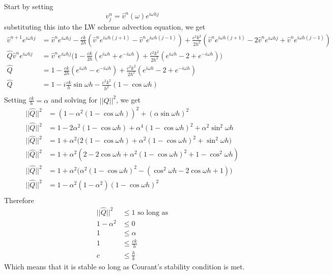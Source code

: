 \\
\\
Start by setting
\begin{equation*}
  v^n_j = \hat{v}^n(\omega)e^{i\omega hj}
\end{equation*}
substituting this into the LW scheme advection equation, we get
\begin{equation*}
\begin{aligned}
  \hat{v}^{n+1}e^{i\omega hj} &= \hat{v}^ne^{i\omega hj}-\frac{ck}{2h}(\hat{v}^ne^{i\omega h(j+1)} - \hat{v}^ne^{i\omega h(j-1)}) + \frac{c^2k^2}{2h^2}(\hat{v}^ne^{i\omega h(j+1)} -2\hat{v}^ne^{i\omega hj} + \hat{v}^ne^{i\omega h(j-1)}) \\
  \hat{Q}\hat{v}^ne^{i\omega hj} &= \hat{v}^ne^{i\omega hj} \big(1 - \frac{ck}{2h}(e^{i\omega h}+e^{-i\omega h}) + \frac{c^2k^2}{2h^2}(e^{i\omega h} -2+ e^{-i\omega h})\big)\\
  \hat{Q} &= 1 - \frac{ck}{2h}(e^{i\omega h}-e^{-i\omega h}) + \frac{c^2k^2}{2h^2}(e^{i\omega h} -2+ e^{-i\omega h})\\
  \hat{Q} &= 1 - i\frac{ck}{h}\sin\omega h - \frac{c^2k^2}{h^2}(1 - \cos\omega h)\\
\end{aligned}
\end{equation*}
Setting $\frac{ck}{h}=\alpha$ and solving for $||\hat{Q}||^2$, we get
\begin{equation*}
\begin{aligned}
  ||\hat{Q}||^2 &= (1 - \alpha^2(1 - \cos\omega h))^2 + (\alpha\sin\omega h)^2\\
  ||\hat{Q}||^2 &= 1 - 2\alpha^2(1 - \cos\omega h) + \alpha^4(1 - \cos\omega h)^2 + \alpha^2\sin^2\omega h\\
  ||\hat{Q}||^2 &= 1 + \alpha^2 \big( 2(1 - \cos\omega h) + \alpha^2(1 - \cos\omega h)^2 + \sin^2\omega h \big)\\
  ||\hat{Q}||^2 &= 1 + \alpha^2 ( 2 - 2\cos\omega h + \alpha^2(1 - \cos\omega h)^2 + 1 -\cos^2\omega h )\\
  ||\hat{Q}||^2 &= 1 + \alpha^2 \big( \alpha^2(1 - \cos\omega h)^2 - (\cos^2\omega h - 2\cos\omega h + 1) \big)\\
  ||\hat{Q}||^2 &= 1 - \alpha^2 (1 - \alpha^2)(1 - \cos\omega h)^2\\
\end{aligned}
\end{equation*}
Therefore
\begin{equation*}
\begin{aligned}
  ||\hat{Q}||^2 &\leq 1 \text{ so long as}\\
  1- \alpha^2 	&\leq 0 \\
  1	 	&\leq \alpha \\
  1		&\leq \frac{ck}{h} \\
  c		&\leq \frac{h}{k}
\end{aligned}
\end{equation*}
Which means that it is stable so long as Courant's stability condition is met.
